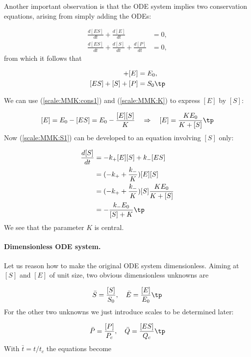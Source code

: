 \documentclass[graybox,envcountchap,sectrefs,final]{svmonodo}
\begin{document}
Another important observation is that the ODE system implies
two conservation equations, arising from simply adding the ODEs:

\begin{align}
\frac{d[ES]}{dt} + \frac{d[E]}{dt} & =0,\\ 
\frac{d[ES]}{dt} + \frac{d[S]}{dt} + \frac{d[P]}{dt} &= 0,
\end{align}
from which it follows that

\begin{align}
[ES] + [E] &= E_0,
\label{scale:MMK:cons1}\\ 
[ES] + [S] + [P] &= S_0\tp
\label{scale:MMK:cons2}
\end{align}

We can use (\ref{scale:MMK:cons1}) and (\ref{scale:MMK:K}) to
express $[E]$ by $[S]$:

\[ [E] = E_0 - [ES] = E_0 - \frac{[E][S]}{K}\quad\Rightarrow\quad
[E] = \frac{KE_0}{K + [S]}\tp\]
Now (\ref{scale:MMK:S1}) can be developed to an equation involving
$[S]$ only:

\begin{align}
\frac{d[S]}{dt} &= -k_+[E][S] + k_-[ES]\nonumber\\ 
& = (-k_+ + \frac{k_-}{K})[E][S]\nonumber\\ 
& = (-k_+ + \frac{k_-}{K})[S]\frac{KE_0}{K + [S]}\nonumber\\ 
& = - \frac{k_-E_0}{[S] + K}\tp
\label{scale:MMK:Seq1}
\end{align}
We see that the parameter $K$ is central.


\paragraph{Dimensionless ODE system.}
Let us reason how to make the original ODE system dimensionless.
Aiming at $[S]$ and $[E]$ of unit size, two obvious dimensionless
unknowns are

\[ \bar S = \frac{[S]}{S_0},\quad
\bar E = \frac{[E]}{E_0}\tp\]
For the other two unknowns we just introduce scales to be determined
later:

\[
\bar P = \frac{[P]}{P_c},\quad
\bar{Q} = \frac{[ES]}{Q_c}\tp
\]
With $\bar t = t/t_c$ the equations become
\end{document}
